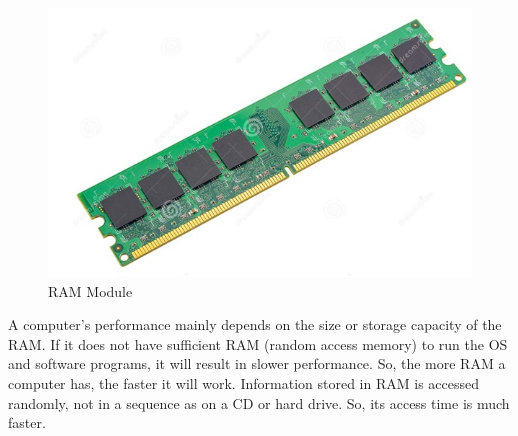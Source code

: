 \documentclass[11pt,a4paper,twoside]{article}
\begin{document}
\begin{figure}[H]
\includegraphics[width=1\textwidth]{Fig 10.jpg}
\caption{RAM Module}
\end{figure}
A computer's performance mainly depends on the size or storage capacity of the RAM. If it does not have sufficient RAM (random access memory) to run the OS and software programs, it will result in slower performance. So, the more RAM a computer has, the faster it will work. Information stored in RAM is accessed randomly, not in a sequence as on a CD or hard drive. So, its access time is much faster.
\end{document}
